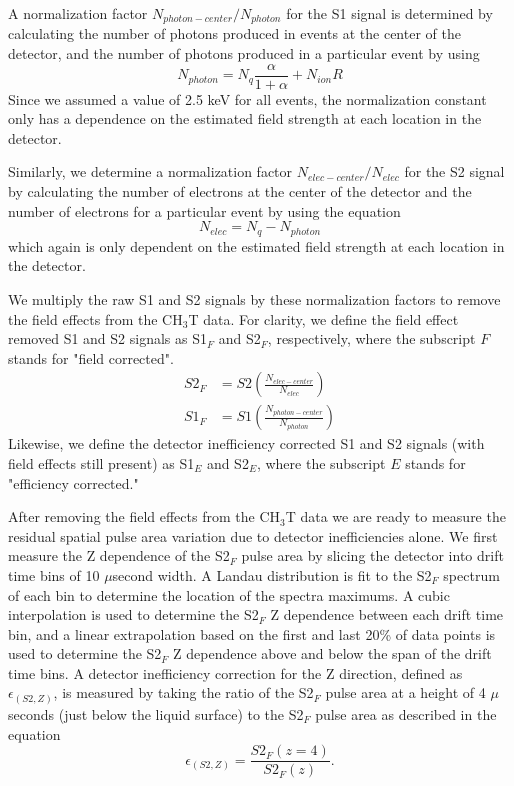 A normalization factor $N_{photon-center}/N_{photon}$ for the S1 signal is determined by calculating the number of photons produced in events at the center of the detector, and the number of photons produced in a particular event by using
\begin{equation}
N_{photon} = N_q\frac{\alpha}{1+\alpha} + N_{ion}R
\end{equation}
Since we assumed a value of 2.5 keV for all events, the normalization constant only has a dependence on the estimated field strength at each location in the detector.  

Similarly, we determine a normalization factor $N_{elec-center}/N_{elec}$ for the S2 signal by calculating the number of electrons at the center of the detector and the number of electrons for a particular event by using the equation
\begin{equation}
N_{elec}=N_q-N_{photon}
\end{equation}
which again is only dependent on the estimated field strength at each location in the detector.  

We multiply the raw S1 and S2 signals by these normalization factors to remove the field effects from the CH$_3$T data.  For clarity, we define the field effect removed S1 and S2 signals as S1$_F$ and S2$_F$, respectively, where the subscript $F$ stands for "field corrected".   
\begin{align}
S2_F &=S2 \left( \frac{N_{elec-center}}{N_{elec}} \right) \\
S1_F &=S1 \left( \frac{N_{photon-center}}{N_{photon}} \right)
\end{align}
Likewise, we define the detector inefficiency corrected S1 and S2 signals (with field effects still present) as S1$_E$ and S2$_E$, where the subscript $E$ stands for "efficiency corrected."

After removing the field effects from the CH$_3$T data we are ready to measure the residual spatial pulse area variation due to detector inefficiencies alone.  We first measure the Z dependence of the S2$_F$ pulse area by slicing the detector into drift time bins of 10 $\mu$second width.  A Landau distribution is fit to the S2$_F$ spectrum of each bin to determine the location of the spectra maximums.  A cubic interpolation is used to determine the S2$_F$ Z dependence between each drift time bin, and a linear extrapolation based on the first and last 20\% of data points is used to determine the S2$_F$ Z dependence above and below the span of the drift time bins.  A detector inefficiency correction for the Z direction, defined as $\epsilon_{(S2,Z)}$, is measured by taking the ratio of the S2$_F$ pulse area at a height of 4 $\mu$seconds (just below the liquid surface) to the S2$_F$ pulse area as described in the equation
\begin{equation}
\epsilon_{(S2,Z)}= \frac{S2_F(z=4)}{S2_F(z)}.
\end{equation} 


